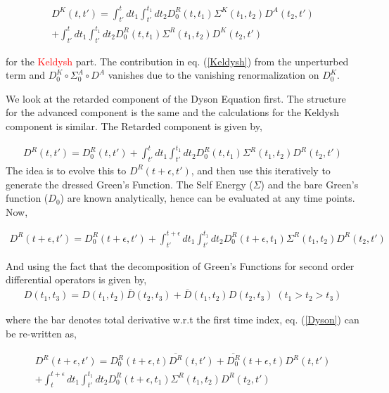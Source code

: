 \documentclass{amsart}
\begin{document}
    \begin{multline}\label{Keldysh}
        D^K(t , t') = \int^t_{t'} dt_1\int^{t_1}_{t'} dt_2 D_0^R(t, t_1) \Sigma^K (t_1,t_2) D^A(t_2, t') \\
                                    +  \int^t_{t'} dt_1\int^{t_1}_{t'} dt_2 D_0^R(t, t_1) \Sigma^R (t_1,t_2) D^K(t_2, t')
    \end{multline}
   
   \par for the \textcolor{red}{Keldysh} part. The contribution in eq. (\ref{Keldysh}) from the unperturbed term and $D_0^K\circ \Sigma_0^A\circ D^A$ vanishes due to the vanishing renormalization on $D_0^K$. 
    
    
    We look at the retarded component of the Dyson Equation first. The structure for the advanced component is the same and the calculations for the Keldysh component is similar. The Retarded component is given by,

    \begin{align}
        D^R(t , t') = D_0^R(t, t') + \int^t_{t'} dt_1\int^{t_1}_{t'} dt_2 D_0^R(t, t_1) \Sigma^R (t_1,t_2) D^R(t_2, t')
    \end{align}
     The idea is to evolve this to $D^R(t+\epsilon , t')$, and then use this iteratively to generate the dressed Green's Function. The Self Energy ($\Sigma$) and the bare Green's function ($D_0$) are known analytically, hence can be evaluated at any time points. Now,  
     
    \begin{align}\label{Dyson}
        D^R(t+\epsilon , t') = D_0^R(t+\epsilon, t') + \int^{t+\epsilon}_{t'} dt_1\int^{t_1}_{t'} dt_2 D_0^R(t+\epsilon, t_1) \Sigma^R (t_1,t_2) D^R(t_2, t')
    \end{align}
    
    And using the fact that the decomposition of Green's Functions for second order differential operators is given by,
    \begin{align}
        D(t_1 , t_3)=D(t_1 , t_2)\overline{D}(t_2 , t_3)+\overline{D}(t_1 , t_2)D(t_2 , t_3) \; (t_1>t_2>t_3)
    \end{align}
    
    where the bar denotes total derivative w.r.t the first time index, eq. (\ref{Dyson}) can be re-written as,
    
    \par 
    \begin{multline}\label{DysonReduced}
        D^R(t+\epsilon , t') = D^R_0(t+\epsilon , t)\overline{D^R}(t , t')+\overline{D^R_0}(t+\epsilon , t)D^R(t , t')
        \\ + \int^{t+\epsilon}_{t} dt_1\int^{t_1}_{t'} dt_2 D_0^R(t+\epsilon, t_1) \Sigma^R (t_1,t_2) D^R(t_2, t')
    \end{multline}
        
\end{document}
